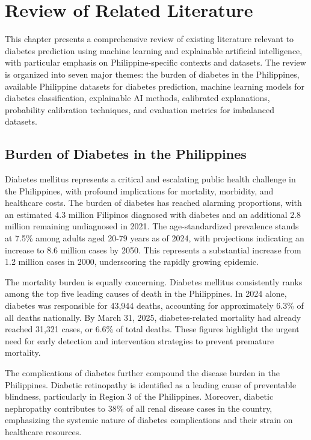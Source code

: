 \section{Review of Related Literature}

This chapter presents a comprehensive review of existing literature relevant to diabetes prediction using machine learning and explainable artificial intelligence, with particular emphasis on Philippine-specific contexts and datasets. The review is organized into seven major themes: the burden of diabetes in the Philippines, available Philippine datasets for diabetes prediction, machine learning models for diabetes classification, explainable AI methods, calibrated explanations, probability calibration techniques, and evaluation metrics for imbalanced datasets.

\subsection{Burden of Diabetes in the Philippines}

Diabetes mellitus represents a critical and escalating public health challenge in the Philippines, with profound implications for mortality, morbidity, and healthcare costs. The burden of diabetes has reached alarming proportions, with an estimated 4.3 million Filipinos diagnosed with diabetes and an additional 2.8 million remaining undiagnosed in 2021. The age-standardized prevalence stands at 7.5\% among adults aged 20-79 years as of 2024, with projections indicating an increase to 8.6 million cases by 2050. This represents a substantial increase from 1.2 million cases in 2000, underscoring the rapidly growing epidemic.

The mortality burden is equally concerning. Diabetes mellitus consistently ranks among the top five leading causes of death in the Philippines. In 2024 alone, diabetes was responsible for 43,944 deaths, accounting for approximately 6.3\% of all deaths nationally. By March 31, 2025, diabetes-related mortality had already reached 31,321 cases, or 6.6\% of total deaths. These figures highlight the urgent need for early detection and intervention strategies to prevent premature mortality.

The complications of diabetes further compound the disease burden in the Philippines. Diabetic retinopathy is identified as a leading cause of preventable blindness, particularly in Region 3 of the Philippines. Moreover, diabetic nephropathy contributes to 38\% of all renal disease cases in the country, emphasizing the systemic nature of diabetes complications and their strain on healthcare resources.

